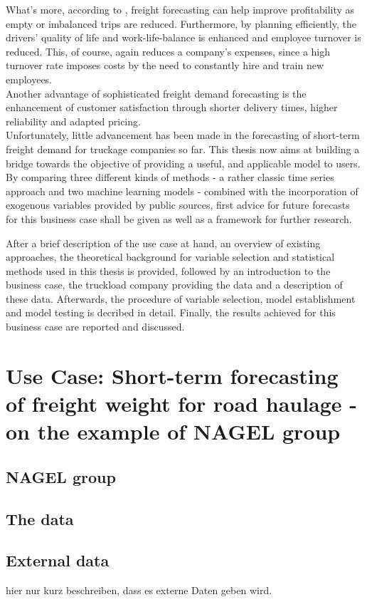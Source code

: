 \documentclass[a4paper, 11pt]{article}
\begin{document}
What's more, according to \cite{Fite.2002}, freight forecasting can help improve profitability as empty or imbalanced trips are reduced. Furthermore, by planning efficiently, the drivers' quality of life and work-life-balance is enhanced and employee turnover is reduced. This, of course, again reduces a company's expenses, since a high turnover rate imposes costs by the need to constantly hire and train new employees.\\
Another advantage of sophisticated freight demand forecasting is the enhancement of customer satisfaction through shorter delivery times, higher reliability and adapted pricing.\\

Unfortunately, little advancement has been made in the forecasting of short-term freight demand for truckage companies so far. This thesis now aims at building a bridge towards the objective of providing a useful,  and applicable model to users.\\
By comparing three different kinds of methods - a rather classic time series approach and two machine learning models - combined with the incorporation of exogenous variables provided by public sources, first advice for future forecasts for this business case shall be given as well as a framework for further research.

After a brief description of the use case at hand, an overview of existing approaches, the theoretical background for variable selection and statistical methods used in this thesis is provided, followed by an introduction to the business case, the truckload company providing the data and a description of these data. Afterwards, the procedure of variable selection, model establishment and model testing is decribed in detail. Finally, the results achieved for this business case are reported and discussed. 

\section{Use Case: Short-term forecasting of freight weight for road haulage - on the example of NAGEL group}
\subsection{NAGEL group}
\subsection{The data}
\subsection{External data}
hier nur kurz beschreiben, dass es externe Daten geben wird.
\end{document}
